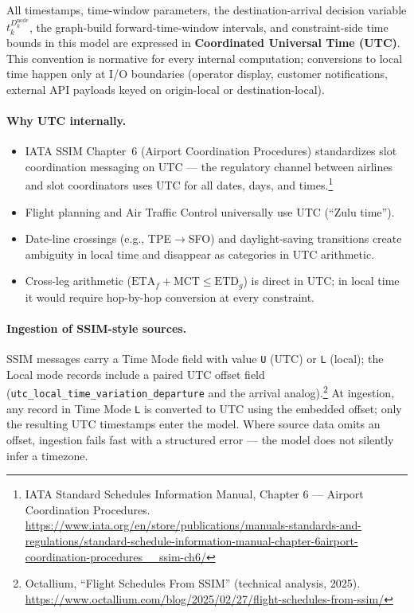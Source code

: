 \documentclass[11pt,a4paper]{article}
\theoremstyle{definition}
\begin{document}
All timestamps, time-window parameters, the destination-arrival decision
variable $t_k^{D_k^{\text{node}}}$, the graph-build forward-time-window
intervals, and constraint-side time bounds in this model are expressed in
\textbf{Coordinated Universal Time (UTC)}. This convention is normative for
every internal computation; conversions to local time happen only at I/O
boundaries (operator display, customer notifications, external API payloads
keyed on origin-local or destination-local).

\paragraph{Why UTC internally.}
\begin{itemize}[noitemsep]
  \item IATA SSIM Chapter~6 (Airport Coordination Procedures) standardizes slot
        coordination messaging on UTC --- the regulatory channel between
        airlines and slot coordinators uses UTC for all dates, days, and
        times.\footnote{IATA Standard Schedules Information Manual,
        Chapter 6 --- Airport Coordination Procedures.
        \url{https://www.iata.org/en/store/publications/manuals-standards-and-regulations/standard-schedule-information-manual-chapter-6airport-coordination-procedures__ssim-ch6/}}
  \item Flight planning and Air Traffic Control universally use UTC (``Zulu time'').
  \item Date-line crossings (e.g., TPE$\to$SFO) and daylight-saving transitions create
        ambiguity in local time and disappear as categories in UTC arithmetic.
  \item Cross-leg arithmetic ($\text{ETA}_f + \text{MCT} \leq \text{ETD}_g$) is direct in
        UTC; in local time it would require hop-by-hop conversion at every constraint.
\end{itemize}

\paragraph{Ingestion of SSIM-style sources.}
SSIM messages carry a Time Mode field with value \texttt{U} (UTC) or \texttt{L} (local);
the Local mode records include a paired UTC offset field
(\texttt{utc\_local\_time\_variation\_departure} and the arrival analog).\footnote{Octallium,
``Flight Schedules From SSIM'' (technical analysis, 2025).
\url{https://www.octallium.com/blog/2025/02/27/flight-schedules-from-ssim/}} At
ingestion, any record in Time Mode \texttt{L} is converted to UTC using the embedded
offset; only the resulting UTC timestamps enter the model. Where source data omits an
offset, ingestion fails fast with a structured error --- the model does not silently
infer a timezone.
\end{document}
